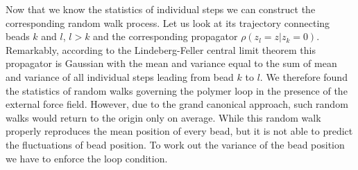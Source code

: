\documentclass[aps,showpacs,twocolumn,floatfix,prx,superscriptaddress]{revtex4-1}
\begin{document}
Now that we know the statistics of individual steps we can construct the corresponding random walk process. Let us look at its trajectory connecting beads $k$ and $l$, $l>k$ and the corresponding propagator $\rho(z_l=z|z_k=0)$. Remarkably, according to the Lindeberg-Feller central limit theorem \cite{Feller2008,Athreya2006} this propagator is  Gaussian with the mean and variance equal to the sum of mean and variance of all individual steps leading from bead $k$ to $l$. We therefore found the statistics of random walks governing the polymer loop in the presence of the external force field. However, due to the grand canonical approach, such random walks would return to the origin only on average. While this random walk properly reproduces the mean position of every bead, but it is not able to predict the fluctuations of bead position. To work out the variance of the bead position we have to enforce the loop condition.
 
\end{document}
